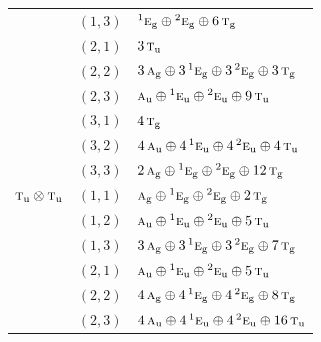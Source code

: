 \documentclass[11pt]{article}
\newcommand{\irr}[1]{\text{\normalfont\scshape #1}}
\newcommand{\conjpair}[1]{{}^{#1}}
\newcommand{\ptag}[1]{\mathrm{#1}}
\begin{document}
\begin{longtable}{p{} c p{}}
 & $(1,3)$ & $\conjpair{1}\irr{e}_{\ptag{g}}\oplus \conjpair{2}\irr{e}_{\ptag{g}}\oplus 6\,\irr{t}_{\ptag{g}}$\\

 & $(2,1)$ & $3\,\irr{t}_{\ptag{u}}$\\

 & $(2,2)$ & $3\,\irr{a}_{\ptag{g}}\oplus 3\,\conjpair{1}\irr{e}_{\ptag{g}}\oplus 3\,\conjpair{2}\irr{e}_{\ptag{g}}\oplus 3\,\irr{t}_{\ptag{g}}$\\

 & $(2,3)$ & $\irr{a}_{\ptag{u}}\oplus \conjpair{1}\irr{e}_{\ptag{u}}\oplus \conjpair{2}\irr{e}_{\ptag{u}}\oplus 9\,\irr{t}_{\ptag{u}}$\\

 & $(3,1)$ & $4\,\irr{t}_{\ptag{g}}$\\

 & $(3,2)$ & $4\,\irr{a}_{\ptag{u}}\oplus 4\,\conjpair{1}\irr{e}_{\ptag{u}}\oplus 4\,\conjpair{2}\irr{e}_{\ptag{u}}\oplus 4\,\irr{t}_{\ptag{u}}$\\

 & $(3,3)$ & $2\,\irr{a}_{\ptag{g}}\oplus \conjpair{1}\irr{e}_{\ptag{g}}\oplus \conjpair{2}\irr{e}_{\ptag{g}}\oplus 12\,\irr{t}_{\ptag{g}}$\\

\hline

$\irr{t}_{\ptag{u}}\otimes \irr{t}_{\ptag{u}}$ & $(1,1)$ & $\irr{a}_{\ptag{g}}\oplus \conjpair{1}\irr{e}_{\ptag{g}}\oplus \conjpair{2}\irr{e}_{\ptag{g}}\oplus 2\,\irr{t}_{\ptag{g}}$\\

 & $(1,2)$ & $\irr{a}_{\ptag{u}}\oplus \conjpair{1}\irr{e}_{\ptag{u}}\oplus \conjpair{2}\irr{e}_{\ptag{u}}\oplus 5\,\irr{t}_{\ptag{u}}$\\

 & $(1,3)$ & $3\,\irr{a}_{\ptag{g}}\oplus 3\,\conjpair{1}\irr{e}_{\ptag{g}}\oplus 3\,\conjpair{2}\irr{e}_{\ptag{g}}\oplus 7\,\irr{t}_{\ptag{g}}$\\

 & $(2,1)$ & $\irr{a}_{\ptag{u}}\oplus \conjpair{1}\irr{e}_{\ptag{u}}\oplus \conjpair{2}\irr{e}_{\ptag{u}}\oplus 5\,\irr{t}_{\ptag{u}}$\\

 & $(2,2)$ & $4\,\irr{a}_{\ptag{g}}\oplus 4\,\conjpair{1}\irr{e}_{\ptag{g}}\oplus 4\,\conjpair{2}\irr{e}_{\ptag{g}}\oplus 8\,\irr{t}_{\ptag{g}}$\\

 & $(2,3)$ & $4\,\irr{a}_{\ptag{u}}\oplus 4\,\conjpair{1}\irr{e}_{\ptag{u}}\oplus 4\,\conjpair{2}\irr{e}_{\ptag{u}}\oplus 16\,\irr{t}_{\ptag{u}}$\\


\end{longtable}
\end{document}
